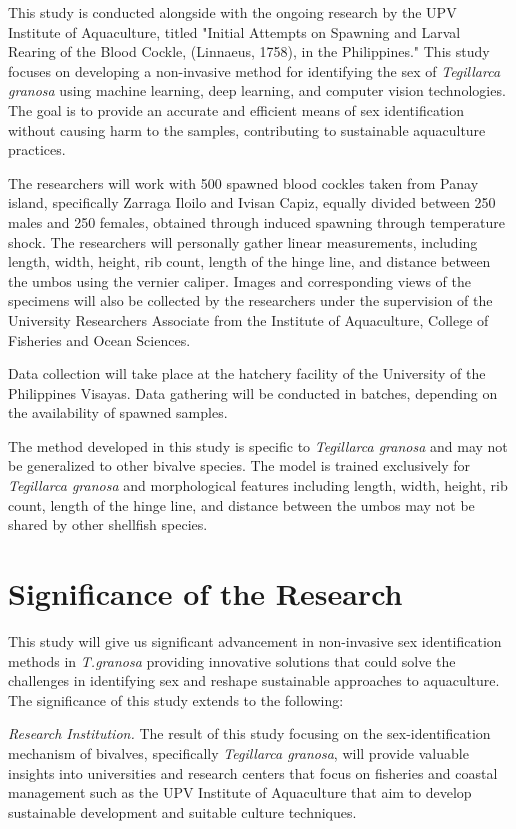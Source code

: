 This study is conducted alongside with the ongoing research by the UPV Institute of Aquaculture, titled "Initial Attempts on Spawning and Larval Rearing of the Blood Cockle, \Tegillarcagranosa (Linnaeus, 1758), in the Philippines." This study focuses on developing a non-invasive method for identifying the sex of \textit{Tegillarca granosa} using machine learning, deep learning, and computer vision technologies. The goal is to provide an accurate and efficient means of sex identification without causing harm to the samples, contributing to sustainable aquaculture practices.

The researchers will work with 500 spawned blood cockles taken from Panay island, specifically Zarraga Iloilo and Ivisan Capiz, equally divided between 250 males and 250 females, obtained through induced spawning through temperature shock. The researchers will personally gather linear measurements, including length, width, height, rib count, length of the hinge line, and distance between the umbos using the vernier caliper. Images and corresponding views of the specimens will also be collected by the researchers under the supervision of the University Researchers Associate from the Institute of Aquaculture, College of Fisheries and Ocean Sciences.

Data collection will take place at the hatchery facility of the University of the Philippines Visayas. Data gathering will be conducted in batches, depending on the availability of spawned samples.

The method developed in this study is specific to \textit{Tegillarca granosa} and may not be generalized to other bivalve species. The model is trained exclusively for \textit{Tegillarca granosa} and  morphological features including length, width, height, rib count, length of the hinge line, and distance between the umbos may not be shared by other shellfish species. 

\section{Significance of the Research}
\label{sec:significance}

This study will give us significant advancement in non-invasive sex identification methods in \textit{T.granosa} providing innovative solutions that could solve the challenges in identifying sex  and reshape sustainable approaches to aquaculture. The significance of this study extends to the following:

 \textit{Research Institution.} The result of this study focusing on the sex-identification mechanism of bivalves, specifically \textit{Tegillarca granosa}, will provide valuable insights into universities and research centers that focus on fisheries and coastal management such as the UPV Institute of Aquaculture that aim to develop sustainable development and suitable culture techniques.

